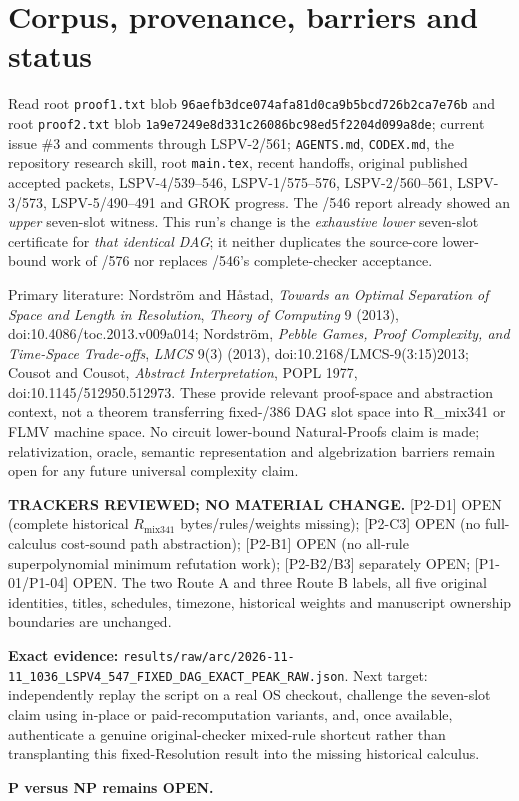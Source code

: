 \documentclass[11pt]{article}
\begin{document}
\section*{Corpus, provenance, barriers and status}
Read root \texttt{proof1.txt} blob \texttt{96aefb3dce074afa81d0ca9b5bcd726b2ca7e76b} and root \texttt{proof2.txt} blob \texttt{1a9e7249e8d331c26086bc98ed5f2204d099a8de}; current issue \#3 and comments through LSPV-2/561; \texttt{AGENTS.md}, \texttt{CODEX.md}, the repository research skill, root \texttt{main.tex}, recent handoffs, original published accepted packets, LSPV-4/539--546, LSPV-1/575--576, LSPV-2/560--561, LSPV-3/573, LSPV-5/490--491 and GROK progress. The /546 report already showed an \emph{upper} seven-slot witness. This run's change is the \emph{exhaustive lower} seven-slot certificate for \emph{that identical DAG}; it neither duplicates the source-core lower-bound work of /576 nor replaces /546's complete-checker acceptance.

Primary literature: Nordstr\"om and H\aa stad, \emph{Towards an Optimal Separation of Space and Length in Resolution}, \emph{Theory of Computing} 9 (2013), doi:10.4086/toc.2013.v009a014; Nordstr\"om, \emph{Pebble Games, Proof Complexity, and Time-Space Trade-offs}, \emph{LMCS} 9(3) (2013), doi:10.2168/LMCS-9(3:15)2013; Cousot and Cousot, \emph{Abstract Interpretation}, POPL 1977, doi:10.1145/512950.512973. These provide relevant proof-space and abstraction context, not a theorem transferring fixed-/386 DAG slot space into R_mix341 or FLMV machine space. No circuit lower-bound Natural-Proofs claim is made; relativization, oracle, semantic representation and algebrization barriers remain open for any future universal complexity claim.

\textbf{TRACKERS REVIEWED; NO MATERIAL CHANGE.}
[P2-D1] OPEN (complete historical $R_{\mathrm{mix341}}$ bytes/rules/weights missing);
[P2-C3] OPEN (no full-calculus cost-sound path abstraction);
[P2-B1] OPEN (no all-rule superpolynomial minimum refutation work);
[P2-B2/B3] separately OPEN;
[P1-01/P1-04] OPEN.
The two Route A and three Route B labels, all five original identities, titles, schedules, timezone, historical weights and manuscript ownership boundaries are unchanged.

\textbf{Exact evidence:}
\texttt{results/raw/arc/2026-11-11\_1036\_LSPV4\_547\_FIXED\_DAG\_EXACT\_PEAK\_RAW.json}.
Next target: independently replay the script on a real OS checkout, challenge the seven-slot claim using in-place or paid-recomputation variants, and, once available, authenticate a genuine original-checker mixed-rule shortcut rather than transplanting this fixed-Resolution result into the missing historical calculus.

\textbf{P versus NP remains OPEN.}
\end{document}
